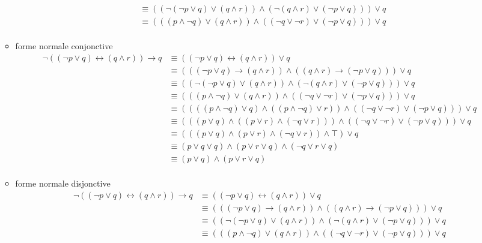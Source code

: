 \documentclass[12pt]{report}
\begin{document}
\begin{enumerate}
\begin{itemize}
\begin{align*}
          & \equiv ((\neg(\neg p \vee q) \vee (q \wedge r)) \wedge (\neg(q \wedge r) \vee (\neg p \vee q))) \vee q\\
          & \equiv (((p \wedge \neg q) \vee (q \wedge r)) \wedge ((\neg q \vee \neg r) \vee (\neg p \vee q))) \vee q\\
        \end{align*}
      \item  forme normale conjonctive
        \begin{align*}
          \neg ((\neg p \vee q) \leftrightarrow (q \wedge r)) \to q  & \equiv ((\neg p \vee q) \leftrightarrow (q \wedge r)) \vee q  \\
          & \equiv (((\neg p \vee q) \to (q \wedge r)) \wedge ((q \wedge r) \to (\neg p \vee q))) \vee q\\
          & \equiv ((\neg(\neg p \vee q) \vee (q \wedge r)) \wedge (\neg(q \wedge r) \vee (\neg p \vee q))) \vee q\\
          & \equiv (((p \wedge \neg q) \vee (q \wedge r)) \wedge ((\neg q \vee \neg r) \vee (\neg p \vee q))) \vee q\\
          & \equiv ((((p \wedge \neg q) \vee q) \wedge ((p \wedge \neg q) \vee r)) \wedge ((\neg q \vee \neg r) \vee (\neg p \vee q))) \vee q\\
          & \equiv (((p \vee q) \wedge ((p \vee r) \wedge (\neg q \vee r))) \wedge ((\neg q \vee \neg r) \vee (\neg p \vee q))) \vee q\\
          & \equiv (((p \vee q) \wedge (p \vee r) \wedge (\neg q \vee r)) \wedge \top) \vee q\\
          & \equiv (p \vee q \vee q) \wedge (p \vee r \vee q) \wedge (\neg q \vee r \vee q)\\
          & \equiv (p \vee q) \wedge (p \vee r \vee q)\\
        \end{align*}
      \item forme normale disjonctive
        \begin{align*}
          \neg ((\neg p \vee q) \leftrightarrow (q \wedge r)) \to q  & \equiv ((\neg p \vee q) \leftrightarrow (q \wedge r)) \vee q  \\
          & \equiv (((\neg p \vee q) \to (q \wedge r)) \wedge ((q \wedge r) \to (\neg p \vee q))) \vee q\\
          & \equiv ((\neg(\neg p \vee q) \vee (q \wedge r)) \wedge (\neg(q \wedge r) \vee (\neg p \vee q))) \vee q\\
          & \equiv (((p \wedge \neg q) \vee (q \wedge r)) \wedge ((\neg q \vee \neg r) \vee (\neg p \vee q))) \vee q\\

\end{align*}
\end{itemize}
\end{enumerate}
\end{document}
